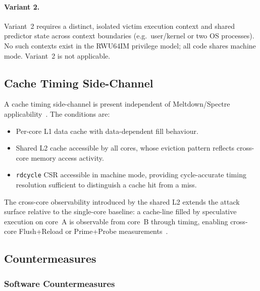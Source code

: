 \paragraph{Variant 2.}
Variant~2 requires a distinct, isolated victim execution context and shared
predictor state across context boundaries (e.g.\ user/kernel or two OS processes).
No such contexts exist in the RWU64IM privilege model; all code shares machine mode.
Variant~2 is not applicable.

\subsection{Cache Timing Side-Channel}
\label{subsec:cache_sidechannel}

A cache timing side-channel is present independent of Meltdown/Spectre
applicability~\cite{gruss2016flushflush,arm2018cache}.  The conditions are:

\begin{itemize}
  \item Per-core \mbox{L1} data cache with data-dependent fill behaviour.
  \item Shared \mbox{L2} cache accessible by all cores, whose eviction pattern
        reflects cross-core memory access activity.
  \item \texttt{rdcycle} CSR accessible in machine mode, providing cycle-accurate
        timing resolution sufficient to distinguish a cache hit from a miss.
\end{itemize}

The cross-core observability introduced by the shared \mbox{L2} extends the
attack surface relative to the single-core baseline: a cache-line filled by
speculative execution on core~A is observable from core~B through timing, enabling
cross-core Flush+Reload or Prime+Probe measurements~\cite{gruss2016flushflush}.

\subsection{Countermeasures}
\label{subsec:countermeasures}

\subsubsection{Software Countermeasures}

